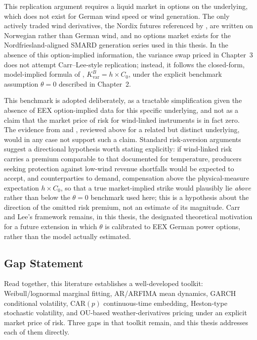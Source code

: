 \documentclass[11pt, a4paper, twoside]{article}
\begin{document}
This replication argument requires a liquid market in options on the underlying, which does not exist for German wind speed or wind generation. The only actively traded wind derivatives, the Nordix futures referenced by \citet{AlexandridisZapranis2013}, are written on Norwegian rather than German wind, and no options market exists for the Nordfriesland-aligned SMARD generation series used in this thesis. In the absence of this option-implied information, the variance swap priced in Chapter~3 does not attempt Carr--Lee-style replication; instead, it follows the closed-form, model-implied formula of \citet{Tol1997}, $K_{\text{var}}^B = h \times C_0$, under the explicit benchmark assumption $\theta = 0$ described in Chapter~2.

This benchmark is adopted deliberately, as a tractable simplification given the absence of EEX option-implied data for this specific underlying, and not as a claim that the market price of risk for wind-linked instruments is in fact zero. The evidence from \citet{HardleLopezCabrera2009} and \citet{DorfleitnerWimmer2010}, reviewed above for a related but distinct underlying, would in any case not support such a claim. Standard risk-aversion arguments suggest a directional hypothesis worth stating explicitly: if wind-linked risk carries a premium comparable to that documented for temperature, producers seeking protection against low-wind revenue shortfalls would be expected to accept, and counterparties to demand, compensation above the physical-measure expectation $h \times C_0$, so that a true market-implied strike would plausibly lie \emph{above} rather than below the $\theta = 0$ benchmark used here; this is a hypothesis about the direction of the omitted risk premium, not an estimate of its magnitude. Carr and Lee's framework remains, in this thesis, the designated theoretical motivation for a future extension in which $\theta$ is calibrated to EEX German power options, rather than the model actually estimated.

\subsection{Gap Statement}
\label{sec:lit-gap}

Read together, this literature establishes a well-developed toolkit: Weibull/lognormal marginal fitting, AR/ARFIMA mean dynamics, GARCH conditional volatility, CAR$(p)$ continuous-time embedding, Heston-type stochastic volatility, and OU-based weather-derivatives pricing under an explicit market price of risk. Three gaps in that toolkit remain, and this thesis addresses each of them directly.
\end{document}
